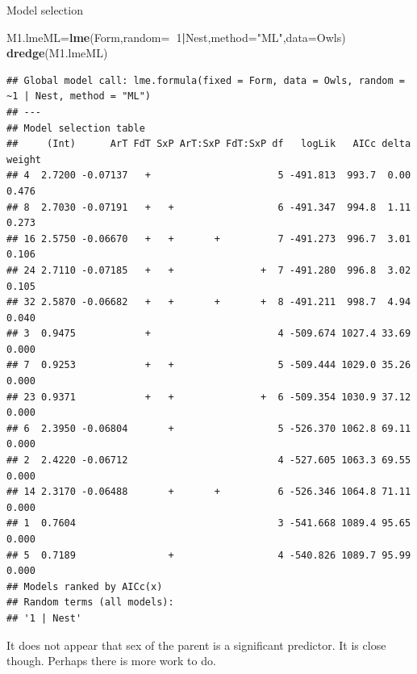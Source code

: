 \documentclass[
  ignorenonframetext,
]{beamer}
\newenvironment{Shaded}{\begin{snugshade}}{\end{snugshade}}
\newcommand{\DataTypeTok}[1]{\textcolor[rgb]{0.13,0.29,0.53}{#1}}
\newcommand{\DecValTok}[1]{\textcolor[rgb]{0.00,0.00,0.81}{#1}}
\newcommand{\KeywordTok}[1]{\textcolor[rgb]{0.13,0.29,0.53}{\textbf{#1}}}
\newcommand{\NormalTok}[1]{#1}
\newcommand{\OperatorTok}[1]{\textcolor[rgb]{0.81,0.36,0.00}{\textbf{#1}}}
\newcommand{\StringTok}[1]{\textcolor[rgb]{0.31,0.60,0.02}{#1}}
\begin{document}
\begin{frame}[fragile]{Model selection}
\protect\hypertarget{model-selection}{}

\tiny

\begin{Shaded}
\begin{Highlighting}[]
\NormalTok{M1.lmeML=}\KeywordTok{lme}\NormalTok{(Form,}\DataTypeTok{random=}\OperatorTok{~}\DecValTok{1}\OperatorTok{|}\NormalTok{Nest,}\DataTypeTok{method=}\StringTok{"ML"}\NormalTok{,}\DataTypeTok{data=}\NormalTok{Owls)}
\KeywordTok{dredge}\NormalTok{(M1.lmeML)}
\end{Highlighting}
\end{Shaded}

\begin{verbatim}
## Global model call: lme.formula(fixed = Form, data = Owls, random = ~1 | Nest, method = "ML")
## ---
## Model selection table 
##     (Int)      ArT FdT SxP ArT:SxP FdT:SxP df   logLik   AICc delta weight
## 4  2.7200 -0.07137   +                      5 -491.813  993.7  0.00  0.476
## 8  2.7030 -0.07191   +   +                  6 -491.347  994.8  1.11  0.273
## 16 2.5750 -0.06670   +   +       +          7 -491.273  996.7  3.01  0.106
## 24 2.7110 -0.07185   +   +               +  7 -491.280  996.8  3.02  0.105
## 32 2.5870 -0.06682   +   +       +       +  8 -491.211  998.7  4.94  0.040
## 3  0.9475            +                      4 -509.674 1027.4 33.69  0.000
## 7  0.9253            +   +                  5 -509.444 1029.0 35.26  0.000
## 23 0.9371            +   +               +  6 -509.354 1030.9 37.12  0.000
## 6  2.3950 -0.06804       +                  5 -526.370 1062.8 69.11  0.000
## 2  2.4220 -0.06712                          4 -527.605 1063.3 69.55  0.000
## 14 2.3170 -0.06488       +       +          6 -526.346 1064.8 71.11  0.000
## 1  0.7604                                   3 -541.668 1089.4 95.65  0.000
## 5  0.7189                +                  4 -540.826 1089.7 95.99  0.000
## Models ranked by AICc(x) 
## Random terms (all models): 
## '1 | Nest'
\end{verbatim}

\normalsize

It does not appear that sex of the parent is a significant predictor. It
is close though. Perhaps there is more work to do.

\end{frame}
\end{document}
